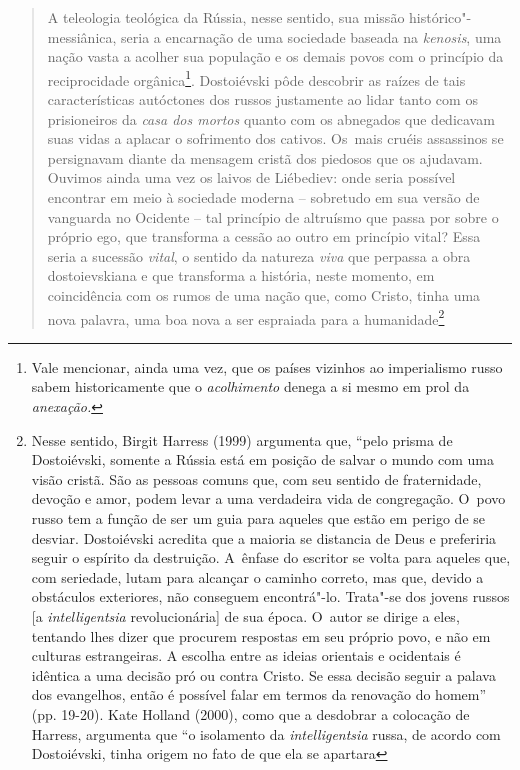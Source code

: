 {\begin{quote}
A teleologia teológica da Rússia, nesse sentido, sua missão
histórico"-messiânica, seria a encarnação de uma sociedade baseada na
\emph{kenosis}, uma nação vasta a acolher sua população e os demais
povos com o princípio da reciprocidade orgânica\footnote{Vale mencionar,
  ainda uma vez, que os países vizinhos ao imperialismo russo sabem
  historicamente que o \emph{acolhimento} denega a si mesmo em prol da
  \emph{anexação. }}. Dostoiévski pôde descobrir as raízes de tais
características autóctones dos russos justamente ao lidar tanto com os
prisioneiros da \emph{casa dos mortos} quanto com os abnegados que
dedicavam suas vidas a aplacar o sofrimento dos cativos. Os~mais cruéis
assassinos se persignavam diante da mensagem cristã dos piedosos que os
ajudavam. Ouvimos ainda uma vez os laivos de Liébediev: onde seria
possível encontrar em meio à sociedade moderna -- sobretudo em sua
versão de vanguarda no Ocidente -- tal princípio de altruísmo que passa
por sobre o próprio ego, que transforma a cessão ao outro em princípio
vital? Essa seria a sucessão \emph{vital}, o sentido da natureza
\emph{viva} que perpassa a obra dostoievskiana e que transforma a
história, neste momento, em coincidência com os rumos de uma nação que,
como Cristo, tinha uma nova palavra, uma boa nova a ser espraiada para a
humanidade\footnote{Nesse sentido, Birgit Harress (1999) argumenta que,
  ``pelo prisma de Dostoiévski, somente a Rússia está em posição de
  salvar o mundo com uma visão cristã. São as pessoas comuns que, com
  seu sentido de fraternidade, devoção e amor, podem levar a uma
  verdadeira vida de congregação. O~povo russo tem a função de ser um
  guia para aqueles que estão em perigo de se desviar. Dostoiévski
  acredita que a maioria se distancia de Deus e preferiria seguir o
  espírito da destruição. A~ênfase do escritor se volta para aqueles
  que, com seriedade, lutam para alcançar o caminho correto, mas que,
  devido a obstáculos exteriores, não conseguem encontrá"-lo. Trata"-se
  dos jovens russos [a \emph{intelligentsia} revolucionária] de sua
  época. O~autor se dirige a eles, tentando lhes dizer que procurem
  respostas em seu próprio povo, e não em culturas estrangeiras. A
  escolha entre as ideias orientais e ocidentais é idêntica a uma
  decisão pró ou contra Cristo. Se essa decisão seguir a palava dos
  evangelhos, então é possível falar em termos da renovação do homem''
  (pp. 19-20). Kate Holland (2000), como que a desdobrar a colocação de
  Harress, argumenta que ``o isolamento da \emph{intelligentsia} russa,
  de acordo com Dostoiévski, tinha origem no fato de que ela se apartara
}
\end{quote}}

